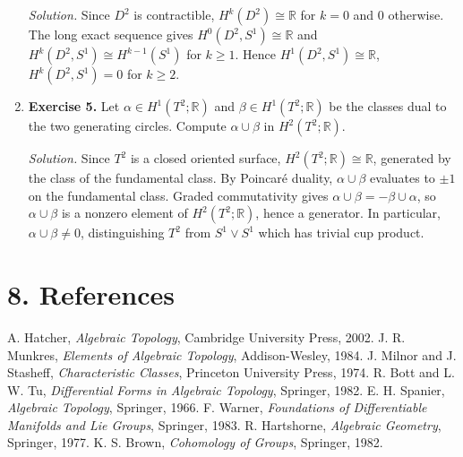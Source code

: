 \begin{enumerate}[leftmargin=*,itemsep=0.9em]
\emph{Solution.} Since $D^2$ is contractible, $H^k(D^2)\cong\mathbb{R}$ for $k=0$ and $0$ otherwise. The long exact sequence gives $H^0(D^2,S^1)\cong\mathbb{R}$ and $H^k(D^2,S^1)\cong H^{k-1}(S^1)$ for $k\geq 1$. Hence $H^1(D^2,S^1)\cong\mathbb{R}$, $H^k(D^2,S^1)=0$ for $k\geq 2$.

\item \textbf{Exercise 5.} Let $\alpha\in H^1(T^2;\mathbb{R})$ and $\beta\in H^1(T^2;\mathbb{R})$ be the classes dual to the two generating circles. Compute $\alpha\cup\beta$ in $H^2(T^2;\mathbb{R})$.

\emph{Solution.} Since $T^2$ is a closed oriented surface, $H^2(T^2;\mathbb{R})\cong\mathbb{R}$, generated by the class of the fundamental class. By Poincar\'e duality, $\alpha\cup\beta$ evaluates to $\pm 1$ on the fundamental class. Graded commutativity gives $\alpha\cup\beta=-\beta\cup\alpha$, so $\alpha\cup\beta$ is a nonzero element of $H^2(T^2;\mathbb{R})$, hence a generator. In particular, $\alpha\cup\beta\neq 0$, distinguishing $T^2$ from $S^1\vee S^1$ which has trivial cup product.

\end{enumerate}
\section*{8. References}


\begin{thebibliography}{9}
 A. Hatcher, \emph{Algebraic Topology}, Cambridge University Press, 2002.
 J. R. Munkres, \emph{Elements of Algebraic Topology}, Addison-Wesley, 1984.
 J. Milnor and J. Stasheff, \emph{Characteristic Classes}, Princeton University Press, 1974.
 R. Bott and L. W. Tu, \emph{Differential Forms in Algebraic Topology}, Springer, 1982.
 E. H. Spanier, \emph{Algebraic Topology}, Springer, 1966.
 F. Warner, \emph{Foundations of Differentiable Manifolds and Lie Groups}, Springer, 1983.
 R. Hartshorne, \emph{Algebraic Geometry}, Springer, 1977.
 K. S. Brown, \emph{Cohomology of Groups}, Springer, 1982.
\end{thebibliography}
